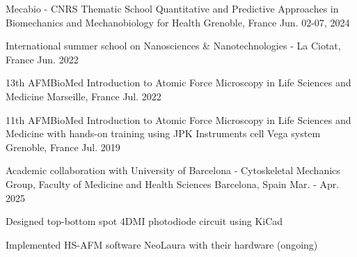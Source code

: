 


\begin{cvhonors}
  \cvhonor
    {Mecabio - CNRS Thematic School}
    {Quantitative and Predictive Approaches in Biomechanics and Mechanobiology for Health}
    {Grenoble, France}
    {Jun. 02-07, 2024}
    {}

  \cvhonor
  	{}
  	{International summer school on Nanosciences \& Nanotechnologies - }
  	{La Ciotat, France}
  	{Jun. 2022}

  \cvhonor
  	{13th AFMBioMed}
  	{Introduction to Atomic Force Microscopy in Life Sciences and Medicine}
  	{Marseille, France}
  	{Jul. 2022}

  \cvhonor
  	{11th AFMBioMed}
  	{Introduction to Atomic Force Microscopy in Life Sciences and Medicine with hands-on training using JPK Instruments cell Vega system}
  	{Grenoble, France}
  	{Jul. 2019}


\end{cvhonors}


\begin{cventries}

  \cventry
    {Academic collaboration with University of Barcelona}
    { - Cytoskeletal Mechanics Group, Faculty of Medicine and Health Sciences}
    {Barcelona, Spain}
    {Mar. - Apr. 2025}
    {
      \begin{cvitems}
        \item{Designed top-bottom spot 4DMI photodiode circuit using KiCad}
        \item{Implemented HS-AFM software NeoLaura with their hardware (ongoing)}
      \end{cvitems}
    }

\end{cventries}
